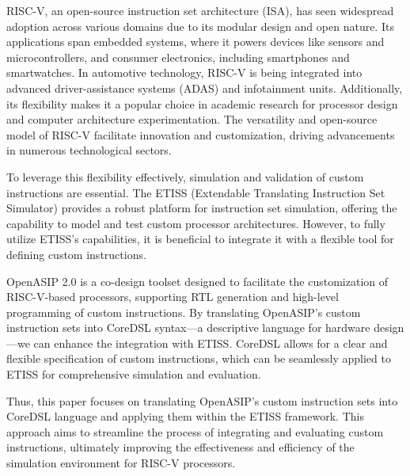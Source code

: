 RISC-V, an open-source instruction set architecture (ISA), has seen widespread adoption across various domains due to its modular design and open nature.
Its applications span embedded systems, where it powers devices like sensors and microcontrollers, and consumer electronics, including smartphones and smartwatches.
In automotive technology, RISC-V is being integrated into advanced driver-assistance systems (ADAS) and infotainment units. Additionally,
its flexibility makes it a popular choice in academic research for processor design and computer architecture experimentation.
The versatility and open-source model of RISC-V facilitate innovation and customization, driving advancements in numerous technological sectors.

To leverage this flexibility effectively, simulation and validation of custom instructions are essential.
The ETISS (Extendable Translating Instruction Set Simulator) \cite{ETISS} provides a robust platform for instruction set simulation,
offering the capability to model and test custom processor architectures.
However, to fully utilize ETISS's capabilities, it is beneficial to integrate it with a flexible tool for defining custom instructions.

OpenASIP 2.0 \cite{OpenASIP} is a co-design toolset designed to facilitate the customization of RISC-V-based processors,
supporting RTL generation and high-level programming of custom instructions.
By translating OpenASIP's custom instruction sets into CoreDSL \cite{CoreDSL} syntax—a descriptive language for hardware design—we can enhance the integration with ETISS.
CoreDSL allows for a clear and flexible specification of custom instructions,
which can be seamlessly applied to ETISS for comprehensive simulation and evaluation.

Thus, this paper focuses on translating OpenASIP's custom instruction sets into CoreDSL language and applying them within the ETISS framework.
This approach aims to streamline the process of integrating and evaluating custom instructions,
ultimately improving the effectiveness and efficiency of the simulation environment for RISC-V processors.